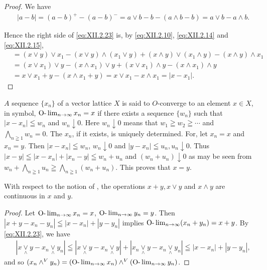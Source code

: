 \begin{proof}
 We have 
\[ \begin{aligned}
&| a - b |  = (a - b) ^{+} - (a - b) ^{-} = a \vee b - b - (a \wedge b - b) = a \vee b - a \wedge b.
\end{aligned}
\]

Hence the right side of \eqref{eq:XII.2.23} is, by \eqref{eq:XII.2.10}, \eqref{eq:XII.2.14} and \eqref{eq:XII.2.15}, 
\[
\begin{aligned}
&= (x \lor y) \lor x _{1} - (x \lor y) \land (x _{1} \lor y) + (x \land y) \lor (x _{1} \land y) - (x \land y) \land x _{1}
\\
&= (x \lor x _{1}) \lor y - (x \land x _{1}) \lor y + (x \lor x _{1}) \land y - (x \land x _{1}) \land y
\\
&= x \lor x _{1} + y - (x \land x _{1} + y) = x \lor x _{1} - x \land x _{1} = | x - x _{1} |.
\end{aligned}
\]
\end{proof}

\begin{definition}\label{def:XII.2.Definition.2} $A$ sequence $\{x_{n}\}$ of a vector lattice $X$ is said to $O$-converge to an element $x \in X$, in symbol, $\text{O-}\lim_{n \to \infty} x_{n} = x$ if there exists a sequence $\{w_{n}\}$ such that $|x - x_{n}| \leqq w_{n}$ and $w_{n} \downarrow 0$. Here $w_{n} \downarrow 0$ means that $w_{1} \geqq w_{2} \geqq \cdots$ and $\bigwedge\limits_{n \geqq 1} w_{n} = 0$. The \Olim $x_{n}$, if it exists, is uniquely determined. For, let \Olim $x_{n} = x$ and \Olim $x_{n} = y$. Then $|x - x_{n}| \leqq w_{n}$, $w_{n} \downarrow 0$ and $|y - x_{n}| \leqq u_{n}, u_{n} \downarrow 0$. Thus $|x - y| \leqq |x - x_{n}| + |x_{n} - y| \leqq w_{n} + u_{n}$ and $(w_{n} + u_{n}) \downarrow 0$ as may be seen from $w_{n} + \bigwedge\limits_{n \geqq 1} u_{n} \geqq \bigwedge\limits_{n \geqq 1} (w_{n} + u_{n})$. This proves that $x = y$. 
\end{definition}

\begin{proposition}\label{prop:XII.2.Proposition.6} With respect to the notion of \Olim, the operations $x + y, x \vee y$ and $x \wedge y$ are continuous in $x$ and $y$. 
\end{proposition}

\begin{proof}
 Let $\text{O-}\lim_{n \to \infty} x_n = x$, $\text{O-}\lim_{n \to \infty} y_n = y$. Then $|x + y - x_n - y_n| \leqq |x - x_n| + |y - y_n|$ implies $\text{O-}\lim_{n \to \infty} (x_n + y_n) = x + y$. By \eqref{eq:XII.2.23}, we have 
\[
\begin{aligned}
&| x \underset {\wedge} {\vee} y - x _{n} \underset {\wedge} {\vee} y _{n} |  \leqq | x \underset {\wedge} {\vee} y - x _{n} \underset {\wedge} {\vee} y | + | x _{n} \underset {\wedge} {\vee} y - x _{n} \underset {\wedge} {\vee} y _{n} | \leqq | x - x _{n} | + | y - y _{n} |,
\end{aligned}
\]
and so \Olim $(x_{n} \wedge^{V} y_{n}) = (\text{O-}\lim_{n \to \infty} x_{n}) \wedge^{V} (\text{O-}\lim_{n \to \infty} y_{n})$. 
\end{proof}

